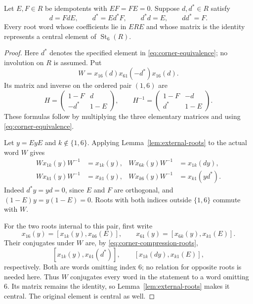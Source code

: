 \begin{lemma}\label{lem:corner-centrality}
Let $E,F\in R$ be idempotents with $EF=FE=0$.  Suppose $d,d^*\in R$ satisfy
\begin{equation}\label{eq:corner-equivalence}
 d=FdE,\qquad d^*=Ed^*F,\qquad d^*d=E,\qquad dd^*=F.
\end{equation}
Every root word whose coefficients lie in $ERE$ and whose matrix is
the identity represents a central element of
$\operatorname{St}_6(R)$.
\end{lemma}

\begin{proof}
Here $d^*$ denotes the specified element in
\eqref{eq:corner-equivalence}; no involution on $R$ is assumed.  Put
\[
 W=x_{16}(d)x_{61}(-d^*)x_{16}(d).
\]
Its matrix and inverse on the ordered pair $(1,6)$ are
\begin{equation}\label{eq:corner-compression-matrix}
 H=\begin{pmatrix}1-F&d\\-d^*&1-E\end{pmatrix},\qquad
 H^{-1}=\begin{pmatrix}1-F&-d\\d^*&1-E\end{pmatrix}.
\end{equation}
These formulas follow by multiplying the three elementary matrices
and using \eqref{eq:corner-equivalence}.

Let $y=EyE$ and $k\notin\{1,6\}$.  Applying
Lemma~\ref{lem:external-roots} to the actual word $W$ gives
\begin{equation}\label{eq:corner-compression-roots}
 \begin{aligned}
 Wx_{1k}(y)W^{-1}&=x_{1k}(y),&
 Wx_{6k}(y)W^{-1}&=x_{1k}(dy),\\
 Wx_{k1}(y)W^{-1}&=x_{k1}(y),&
 Wx_{k6}(y)W^{-1}&=x_{k1}(yd^*).
 \end{aligned}
\end{equation}
Indeed $d^*y=yd=0$, since $E$ and $F$ are orthogonal, and
$(1-E)y=y(1-E)=0$.  Roots with both indices outside $\{1,6\}$
commute with $W$.

For the two roots internal to this pair, first write
\[
 x_{16}(y)=[x_{1k}(y),x_{k6}(E)],\qquad
 x_{61}(y)=[x_{6k}(y),x_{k1}(E)].
\]
Their conjugates under $W$ are, by
\eqref{eq:corner-compression-roots},
\[
 [x_{1k}(y),x_{k1}(d^*)],\qquad
 [x_{1k}(dy),x_{k1}(E)],
\]
respectively.  Both are words omitting index $6$; no relation for
opposite roots is needed here.  Thus $W$ conjugates every word in the
statement to a word omitting $6$.  Its matrix remains the identity,
so Lemma~\ref{lem:external-roots} makes it central.  The original
element is central as well.
\end{proof}

